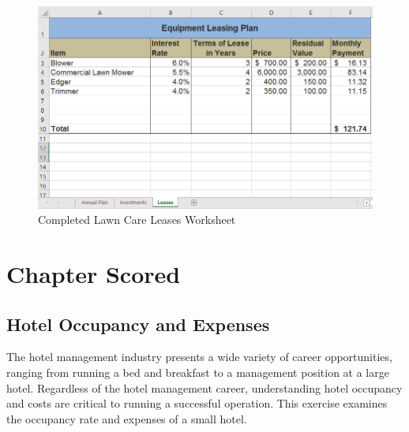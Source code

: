 \begin{figure}[H]
	\centering
	\includegraphics[width=\maxwidth{.95\linewidth}]{gfx/ch02_fig49}
	\caption{Completed Lawn Care Leases Worksheet}
	\label{02:fig49}
\end{figure}

\section{Chapter Scored}

\subsection{Hotel Occupancy and Expenses}

The hotel management industry presents a wide variety of career opportunities, ranging from running a bed and breakfast to a management position at a large hotel. Regardless of the hotel management career, understanding hotel occupancy and costs are critical to running a successful operation. This exercise examines the occupancy rate and expenses of a small hotel.

